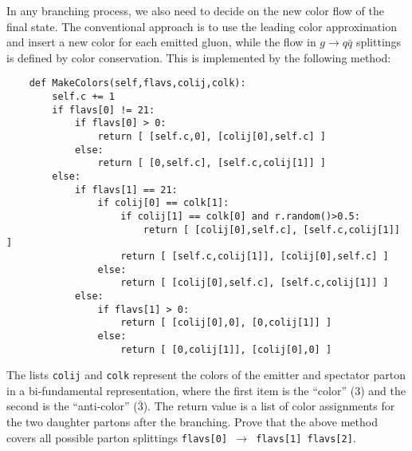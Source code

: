 \documentclass[10pt,fleqn]{scrartcl}
\begin{document}
In any branching process, we also need to decide on the new color flow of the final state.
The conventional approach is to use the leading color approximation and insert a new color
for each emitted gluon, while the flow in $g\to q\bar{q}$ splittings is defined by color 
conservation. This is implemented by the following method:
\begin{verbatim}
    def MakeColors(self,flavs,colij,colk):
        self.c += 1
        if flavs[0] != 21:
            if flavs[0] > 0:
                return [ [self.c,0], [colij[0],self.c] ]
            else:
                return [ [0,self.c], [self.c,colij[1]] ]
        else:
            if flavs[1] == 21:
                if colij[0] == colk[1]:
                    if colij[1] == colk[0] and r.random()>0.5:
                        return [ [colij[0],self.c], [self.c,colij[1]] ]
                    return [ [self.c,colij[1]], [colij[0],self.c] ]
                else:
                    return [ [colij[0],self.c], [self.c,colij[1]] ]
            else:
                if flavs[1] > 0:
                    return [ [colij[0],0], [0,colij[1]] ]
                else:
                    return [ [0,colij[1]], [colij[0],0] ]

\end{verbatim}
The lists {\tt colij} and {\tt colk} represent the colors of the emitter
and spectator parton in a bi-fundamental representation, where the first
item is the ``color'' (3) and the second is the ``anti-color'' ($\bar{3}$).
The return value is a list of color assignments for the two daughter partons 
after the branching. Prove that the above method covers all possible 
parton splittings {\tt flavs[0] $\to$ flavs[1] flavs[2]}.
\end{document}
